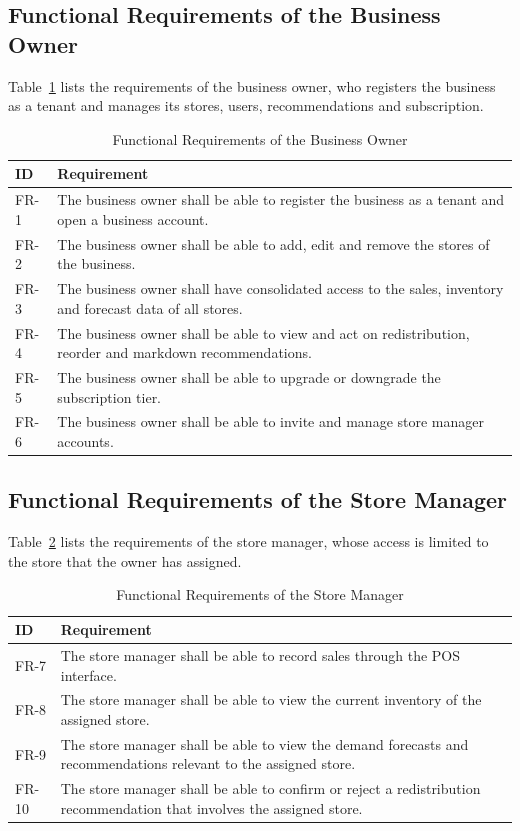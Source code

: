 \documentclass{StockSense}
\begin{document}
\subsection{Functional Requirements of the Business Owner}

Table~\ref{tab:fr-owner} lists the requirements of the business owner, who registers the business as a tenant and manages its stores, users, recommendations and subscription.

\begin{table}[htbp]
\centering
\caption{Functional Requirements of the Business Owner}
\label{tab:fr-owner}
\begin{tabular}{|l|p{12cm}|}
\hline
\textbf{ID} & \textbf{Requirement} \\ \hline
FR-1 & The business owner shall be able to register the business as a tenant and open a business account. \\ \hline
FR-2 & The business owner shall be able to add, edit and remove the stores of the business. \\ \hline
FR-3 & The business owner shall have consolidated access to the sales, inventory and forecast data of all stores. \\ \hline
FR-4 & The business owner shall be able to view and act on redistribution, reorder and markdown recommendations. \\ \hline
FR-5 & The business owner shall be able to upgrade or downgrade the subscription tier. \\ \hline
FR-6 & The business owner shall be able to invite and manage store manager accounts. \\ \hline
\end{tabular}
\end{table}

\subsection{Functional Requirements of the Store Manager}

Table~\ref{tab:fr-manager} lists the requirements of the store manager, whose access is limited to the store that the owner has assigned.

\begin{table}[htbp]
\centering
\caption{Functional Requirements of the Store Manager}
\label{tab:fr-manager}
\begin{tabular}{|l|p{12cm}|}
\hline
\textbf{ID} & \textbf{Requirement} \\ \hline
FR-7 & The store manager shall be able to record sales through the POS interface. \\ \hline
FR-8 & The store manager shall be able to view the current inventory of the assigned store. \\ \hline
FR-9 & The store manager shall be able to view the demand forecasts and recommendations relevant to the assigned store. \\ \hline
FR-10 & The store manager shall be able to confirm or reject a redistribution recommendation that involves the assigned store. \\ \hline
\end{tabular}
\end{table}
\end{document}
